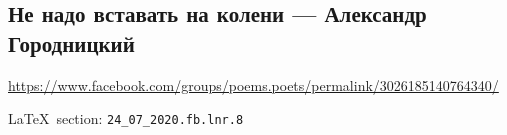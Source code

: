  
 
\subsection{Не надо вставать на колени --- Александр Городницкий}
\url{https://www.facebook.com/groups/poems.poets/permalink/3026185140764340/}
  
\vspace{0.5cm}
\LaTeX~section: \verb|24_07_2020.fb.lnr.8|
\vspace{0.5cm}

